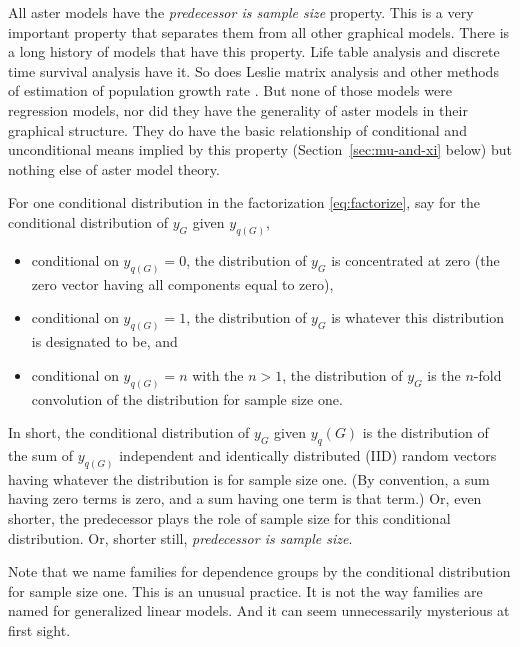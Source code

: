 All aster models have the \emph{predecessor is sample size} property.
This is a very important property that separates them from all other
graphical models.  There is a long history of models that have this
property.  Life table analysis and discrete time survival analysis have it.
So does Leslie matrix analysis \citep{caswell} and other methods
of estimation of population growth rate \citep{fisher,goodman,lenski-service}.
But none of those models were regression models, nor did they have
the generality of aster models in their graphical structure.
They do have the basic relationship of conditional and unconditional means
implied by this property (Section~\ref{sec:mu-and-xi} below)
but nothing else of aster model theory.

For one conditional distribution in the factorization \eqref{eq:factorize},
say for the conditional distribution of $y_G$ given $y_{q(G)}$,
\begin{itemize}
\item conditional on $y_{q(G)} = 0$, the distribution of $y_G$ is concentrated
    at zero (the zero vector having all components equal to zero), 
\item conditional on $y_{q(G)} = 1$, the distribution of $y_G$ is whatever
    this distribution is designated to be, and
\item conditional on $y_{q(G)} = n$ with the $n > 1$, the distribution
    of $y_G$ is the $n$-fold convolution of the distribution for sample
    size one.
\end{itemize}
In short, the conditional distribution of $y_G$ given $y_q(G)$ is the
distribution of the sum of $y_{q(G)}$
independent and identically distributed (IID)
random vectors having whatever the distribution is for sample size one.
(By convention, a sum having zero terms is zero, and a sum having one term
is that term.)
Or, even shorter, the predecessor plays the role of sample size for this
conditional distribution.
Or, shorter still, \emph{predecessor is sample size}.

Note that we name families for dependence groups by the conditional
distribution for sample size one.
This is an unusual practice.  It is not the way families are named for
generalized linear models.
And it can seem unnecessarily mysterious at first sight.

